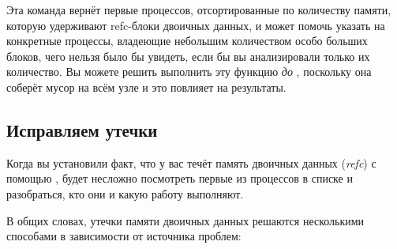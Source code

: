 Эта команда вернёт первые  процессов, отсортированные по количеству памяти, которую удерживают refc-блоки двоичных данных, и может помочь указать на конкретные процессы, владеющие небольшим количеством особо больших блоков, чего нельзя было бы увидеть, если бы вы анализировали только их количество. Вы можете решить выполнить эту функцию \emph{до} , поскольку она соберёт мусор на всём узле и это повлияет на результаты.


\subsection{Исправляем утечки}

Когда вы установили факт, что у вас течёт память двоичных данных (\emph{refc}) с помощью , будет несложно посмотреть первые из процессов в списке и разобраться, кто они и какую работу выполняют.

В общих словах, утечки памяти двоичных данных решаются несколькими способами в зависимости от источника проблем:

